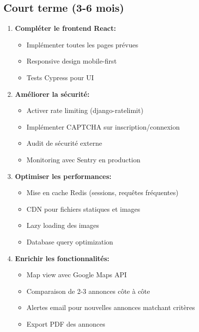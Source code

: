 \subsection{Court terme (3-6 mois)}

\begin{enumerate}
    \item \textbf{Compléter le frontend React:}
    \begin{itemize}
        \item Implémenter toutes les pages prévues
        \item Responsive design mobile-first
        \item Tests Cypress pour UI
    \end{itemize}

    \item \textbf{Améliorer la sécurité:}
    \begin{itemize}
        \item Activer rate limiting (django-ratelimit)
        \item Implémenter CAPTCHA sur inscription/connexion
        \item Audit de sécurité externe
        \item Monitoring avec Sentry en production
    \end{itemize}

    \item \textbf{Optimiser les performances:}
    \begin{itemize}
        \item Mise en cache Redis (sessions, requêtes fréquentes)
        \item CDN pour fichiers statiques et images
        \item Lazy loading des images
        \item Database query optimization
    \end{itemize}

    \item \textbf{Enrichir les fonctionnalités:}
    \begin{itemize}
        \item Map view avec Google Maps API
        \item Comparaison de 2-3 annonces côte à côte
        \item Alertes email pour nouvelles annonces matchant critères
        \item Export PDF des annonces
    \end{itemize}
\end{enumerate}

